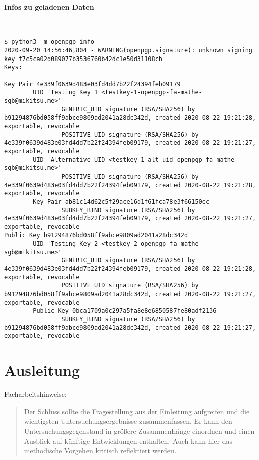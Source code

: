 \documentclass[12pt]{article}
\begin{document}
\paragraph{Infos zu geladenen Daten}~
\begin{lstlisting}
$ python3 -m openpgp info
2020-09-20 14:56:46,804 - WARNING(openpgp.signature): unknown signing key f7c5ca02d089077b3536760b42dc1e50d31108cb
Keys:
------------------------------
Key Pair 4e339f0639d483e03fd4dd7b22f24394feb09179
        UID 'Testing Key 1 <testkey-1-openpgp-fa-mathe-sgb@mikitsu.me>'
                GENERIC_UID signature (RSA/SHA256) by b91294876bd058ff9abce9809ad2041a28dc342d, created 2020-08-22 19:21:28, exportable, revocable
                POSITIVE_UID signature (RSA/SHA256) by 4e339f0639d483e03fd4dd7b22f24394feb09179, created 2020-08-22 19:21:27, exportable, revocable
        UID 'Alternative UID <testkey-1-alt-uid-openpgp-fa-mathe-sgb@mikitsu.me>'
                POSITIVE_UID signature (RSA/SHA256) by 4e339f0639d483e03fd4dd7b22f24394feb09179, created 2020-08-22 19:21:28, exportable, revocable
        Key Pair ab81c14d62c5f29ace16d1f61fca78e3f66150ec
                SUBKEY_BIND signature (RSA/SHA256) by 4e339f0639d483e03fd4dd7b22f24394feb09179, created 2020-08-22 19:21:27, exportable, revocable
Public Key b91294876bd058ff9abce9809ad2041a28dc342d
        UID 'Testing Key 2 <testkey-2-openpgp-fa-mathe-sgb@mikitsu.me>'
                GENERIC_UID signature (RSA/SHA256) by 4e339f0639d483e03fd4dd7b22f24394feb09179, created 2020-08-22 19:21:28, exportable, revocable
                POSITIVE_UID signature (RSA/SHA256) by b91294876bd058ff9abce9809ad2041a28dc342d, created 2020-08-22 19:21:27, exportable, revocable
        Public Key 0bca1709a0c297a5fa8e8e6850587fe80adf2136
                SUBKEY_BIND signature (RSA/SHA256) by b91294876bd058ff9abce9809ad2041a28dc342d, created 2020-08-22 19:21:27, exportable, revocable
\end{lstlisting}

\section{Ausleitung}
Facharbeitshinweise:
\begin{quote}
Der Schluss sollte die Fragestellung aus der Einleitung aufgreifen und die wichtigsten Untersuchungsergebnisse zusammenfassen. Er kann den Untersuchungsgegenstand in größere Zusammenhänge einordnen und einen Ausblick auf künftige Entwicklungen enthalten. Auch kann hier das methodische Vorgehen kritisch reflektiert werden.
\end{quote}
\end{document}
